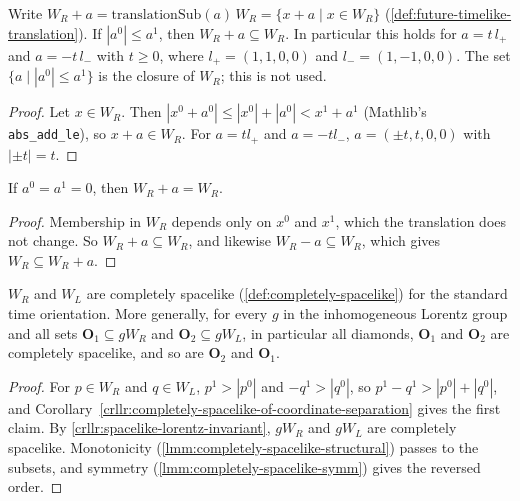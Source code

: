 \begin{lemma}
    \label{lmm:wedge-translations}
    \leanok
    Write $W_R + a = \mathrm{translationSub}(a)\,W_R = \{ x + a \mid x \in W_R \}$ (\ref{def:future-timelike-translation}). If $|a^0| \le a^1$, then $W_R + a \subseteq W_R$. In particular this holds for $a = t\,l_+$ and $a = -t\,l_-$ with $t \ge 0$, where $l_+ = (1, 1, 0, 0)$ and $l_- = (1, -1, 0, 0)$. The set $\{ a \mid |a^0| \le a^1 \}$ is the closure of $W_R$; this is not used.
\end{lemma}
\begin{proof}
    \leanok
    Let $x \in W_R$. Then $|x^0 + a^0| \le |x^0| + |a^0| < x^1 + a^1$ (Mathlib's \texttt{abs\_add\_le}), so $x + a \in W_R$. For $a = t l_+$ and $a = -t l_-$, $a = (\pm t, t, 0, 0)$ with $|{\pm t}| = t$.
\end{proof}

\begin{lemma}
    \label{lmm:wedge-transverse-translations}
    \leanok
    If $a^0 = a^1 = 0$, then $W_R + a = W_R$.
\end{lemma}
\begin{proof}
    \leanok
    Membership in $W_R$ depends only on $x^0$ and $x^1$, which the translation does not change. So $W_R + a \subseteq W_R$, and likewise $W_R - a \subseteq W_R$, which gives $W_R \subseteq W_R + a$.
\end{proof}

\begin{lemma}
    \label{lmm:opposite-wedges-completely-spacelike}
    \leanok
    $W_R$ and $W_L$ are completely spacelike (\ref{def:completely-spacelike}) for the standard time orientation. More generally, for every $g$ in the inhomogeneous Lorentz group and all sets $\mathbf{O}_1 \subseteq gW_R$ and $\mathbf{O}_2 \subseteq gW_L$, in particular all diamonds, $\mathbf{O}_1$ and $\mathbf{O}_2$ are completely spacelike, and so are $\mathbf{O}_2$ and $\mathbf{O}_1$.
\end{lemma}
\begin{proof}
    \leanok
    For $p \in W_R$ and $q \in W_L$, $p^1 > |p^0|$ and $-q^1 > |q^0|$, so $p^1 - q^1 > |p^0| + |q^0|$, and Corollary~\ref{crllr:completely-spacelike-of-coordinate-separation} gives the first claim. By \ref{crllr:spacelike-lorentz-invariant}, $gW_R$ and $gW_L$ are completely spacelike. Monotonicity (\ref{lmm:completely-spacelike-structural}) passes to the subsets, and symmetry (\ref{lmm:completely-spacelike-symm}) gives the reversed order.
\end{proof}

